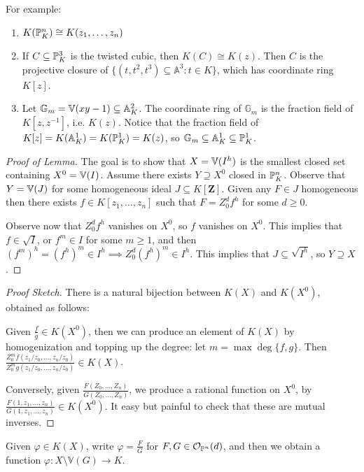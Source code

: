 \documentclass[10pt,a4paper,rgb]{article}
\newcommand{\A}{\mathbb{A}}
\begin{document}
For example:
\begin{enumerate}
\item $K(\P^n_K) \cong K(z_1, \ldots, z_n)$
\item If $C \subseteq \P^3_K$ is the twisted cubic, then $K(C) \cong K(z)$. Then $C$ is the projective closure of $\{(t, t^2, t^3) \subseteq \A^3 : t \in K\}$, which has coordinate ring $K[z]$.
\item Let $\mathbb{G}_m = \V(xy-1) \subseteq \mathbb{A}^2_K$. The coordinate ring of $\mathbb{G}_m$ is the fraction field of $K[z, z^{-1}]$, i.e. $K(z)$. Notice that the fraction field of $K[z] = K(\A^1_K) = K(\P^1_K) = K(z)$, so $\mathbb{G}_m \subseteq \A^1_K \subseteq \P^1_K$.
\end{enumerate}

\begin{proof}[Proof of Lemma]
The goal is to show that $X = \V(I^h)$ is the smallest closed set containing $X^0 = \V(I)$. Assume there exists $Y \supseteq X^0$ closed in $\P^n_K$. Observe that $Y = \V(J)$ for some homogeneous ideal $J \subseteq K[\mathbf{Z}]$. Given any $F \in J$ homogeneous then there exists $f \in K[z_1, \ldots, z_n]$ such that $F = Z_0^d f^h$ for some $d \geq 0$. 

Observe now that $Z_0^d f^h$ vanishes on $X^0$, so $f$ vanishes on $X^0$. This implies that $f \in \sqrt{I}$, or $f^m \in I$ for some $m \geq 1$, and then $(f^m)^h = (f^h)^m \in I^h \implies Z_0^d (f^h)^m \in I^h$. This implies that $J \subseteq \sqrt{I^h}$, so $Y \supseteq X$.
\end{proof}

\begin{proof}[Proof Sketch]
There is a natural bijection between $K(X)$ and $K(X^0)$, obtained as follows:

Given $\frac{f}{g} \in K(X^0)$, then we can produce an element of $K(X)$ by homogenization and topping up the degree: let $m = \max\deg\{f,g\}$. Then $\frac{Z_0^m f(z_1/z_0, \ldots, z_n/z_0)}{Z_0^m g(z_1/z_0, \ldots, z_n/z_0)} \in K(X)$.

Conversely, given  $\frac{F(Z_0, \ldots, Z_n)}{G(Z_0, \ldots, Z_n)}$, we produce a rational function on $X^0$, by $\frac{F(1, z_1, \ldots, z_n)}{G(1, z_1, \ldots, z_n)} \in K(X^0)$. It easy but painful to check that these are mutual inverses.
\end{proof}

Given $\varphi \in K(X)$, write $\varphi = \frac{F}{G}$ for $F, G \in \mathcal{O}_{\P^n}(d)$, and then we obtain a function $\varphi:X \setminus \mathbb{V}(G) \to K$.
\end{document}
